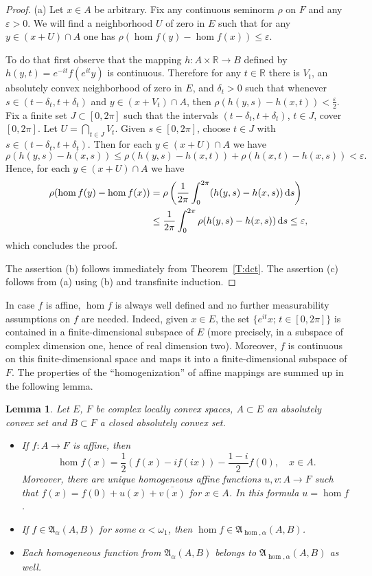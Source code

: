 \documentclass{amsart}
\numberwithin{equation}{section}
\newtheorem{lemma}[thm]{Lemma}
\theoremstyle{definition}
\def\fra{\mathfrak{A}}
\def\ep{\varepsilon}
\def\er{\mathbb R}
\def\ov{\overline}
\def\hom{\operatorname{hom}}
\def\di{\,\mbox{\rm d}}
\newcommand{\setsep}{;\,}
\begin{document}
\begin{proof} (a) Let $x\in A$ be arbitrary. Fix any continuous seminorm $\rho$ on $F$ and any $\ep>0$. We will find a neighborhood $U$ of zero in $E$ such that for any $y\in (x+U)\cap A$ one has $\rho(\hom f(y)-\hom f(x))\le\ep$.

To do that first observe that the mapping $h:A\times\er\to B$ defined by $h(y,t)=e^{-it}f(e^{it}y)$ is continuous. Therefore for any $t\in \er$ there is $V_t$, an absolutely convex neighborhood of zero in $E$, and $\delta_t>0$ such that whenever $s\in(t-\delta_t,t+\delta_t)$ and $y\in (x+V_t)\cap A$, then $\rho(h(y,s)-h(x,t))<\frac\ep2$. Fix a finite set $J\subset[0,2\pi]$ such that the intervals $(t-\delta_t,t+\delta_t)$, $t\in J$, cover
$[0,2\pi]$. Let $U=\bigcap_{t\in J}V_t$. Given $s\in[0,2\pi]$, choose $t\in J$ with $s\in(t-\delta_t,t+\delta_t)$. Then for each $y\in (x+U)\cap A$ we have
$$\rho(h(y,s)-h(x,s))\le\rho(h(y,s)-h(x,t))+\rho(h(x,t)-h(x,s))<\ep.$$
Hence, for each $y\in (x+U)\cap A$ we have
$$\begin{aligned}
\rho(\hom f(y)-\hom f(x))&=\rho\left(\frac1{2\pi}\int_0^{2 \pi} (h(y,s)-h(x,s))\di s\right)
\\&\le \frac1{2\pi}\int_0^{2 \pi} \rho(h(y,s)-h(x,s))\di s\le\ep,
\end{aligned}$$
which concludes the proof.

The assertion (b) follows immediately from Theorem~\ref{T:dct}. The assertion (c) follows from (a) using (b) and transfinite induction.
\end{proof}

In case $f$ is affine, $\hom f$ is always well defined and no further measurability assumptions on $f$ are needed. Indeed, given $x\in E$, the set $\{e^{it}x\setsep t\in[0,2\pi]\}$ is contained in a finite-dimensional subspace of $E$ (more precisely, in a subspace of complex dimension one, hence of real dimension two). Moreover, $f$ is continuous on this finite-dimensional space and maps it into a finite-dimensional subspace of $F$.
The properties of the ``homogenization'' of affine mappings are summed up in the following lemma.

\begin{lemma} Let $E$, $F$ be complex locally convex spaces, $A\subset E$ an absolutely convex set and $B\subset F$ a closed absolutely convex set.
\label{l:homaff}
\begin{itemize}
\item [(a)] If $f:A\to F$ is affine, then $$\hom f(x)=\frac12(f(x)-if(ix))-\frac{1-i}2f(0),\quad x\in A.$$
Moreover, there are unique homogeneous affine functions $u,v:A\to F$ such that $f(x)=f(0)+u(x)+\ov{v(x)}$ for $x\in A$.
In this formula $u=\hom f$.
\item [(b)] If $f\in\fra_{\alpha}(A,B)$ for some $\alpha<\omega_1$, then $\hom f\in\fra_{\hom,\alpha}(A,B)$.
\item [(c)] Each homogeneous function from $\fra_{\alpha}(A,B)$ belongs to $\fra_{\hom,\alpha}(A,B)$ as well.
\end{itemize}
\end{lemma}
\end{document}
